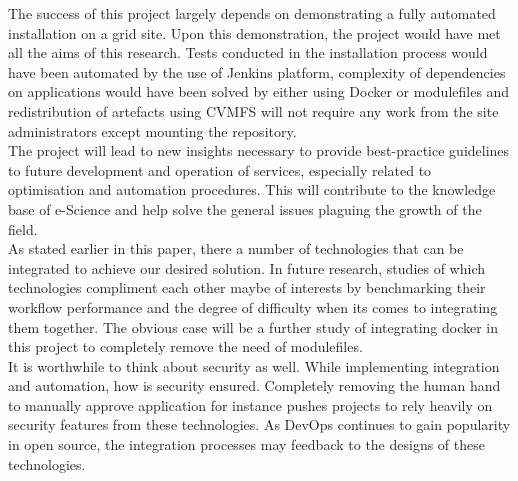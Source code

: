 \documentclass [titlepage,11pt]{article}
\begin{document}
The success of this project largely depends on demonstrating a fully automated installation on a grid site. Upon this demonstration, the project would have met all the aims of this research. Tests conducted in the installation process would have been automated by the use of Jenkins platform, complexity of dependencies on applications would have been solved by either using Docker or modulefiles and redistribution of artefacts using CVMFS will not require any work from the site administrators except mounting the repository.  \\ 

The project will lead to new insights necessary to provide best-practice guidelines to future development and operation of services, especially related to optimisation and automation procedures. This will contribute to the knowledge base of e-Science and help solve the general issues plaguing the growth of the field. \\

As stated earlier in this paper, there a number of technologies that can be integrated to achieve our desired solution. In future research, studies of which technologies compliment each other maybe of interests by benchmarking their workflow performance and the degree of difficulty when its comes to integrating them together. The obvious case will be a further study of integrating docker in this project to completely remove the need of modulefiles. \\ 

It is worthwhile to think about security as well. While implementing integration and automation, how is security ensured. Completely removing the human hand to manually approve application for instance pushes projects to rely heavily on security features from these technologies. As DevOps continues to gain popularity in open source, the integration processes may feedback to the designs of these technologies. 




\end{document}
